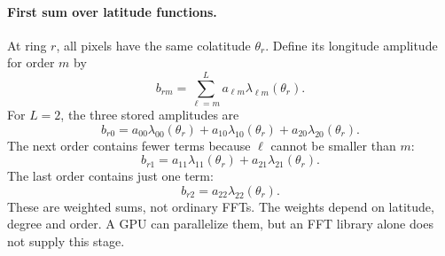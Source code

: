 \documentclass[11pt]{article}
\begin{document}
\paragraph{First sum over latitude functions.}
At ring $r$, all pixels have the same colatitude $\theta_r$. Define its
longitude amplitude for order $m$ by
\begin{equation}
 b_{rm}=\sum_{\ell=m}^{L}a_{\ell m}\lambda_{\ell m}(\theta_r).
\end{equation}
For $L=2$, the three stored amplitudes are
\begin{equation}
 b_{r0}=a_{00}\lambda_{00}(\theta_r)
       +a_{10}\lambda_{10}(\theta_r)+a_{20}\lambda_{20}(\theta_r).
\end{equation}
The next order contains fewer terms because $\ell$ cannot be smaller than $m$:
\begin{equation}
 b_{r1}=a_{11}\lambda_{11}(\theta_r)+a_{21}\lambda_{21}(\theta_r).
\end{equation}
The last order contains just one term:
\begin{equation}
 b_{r2}=a_{22}\lambda_{22}(\theta_r).
\end{equation}
These are weighted sums, not ordinary FFTs. The weights depend on latitude,
degree and order. A GPU can parallelize them, but an FFT library alone does
not supply this stage.
\end{document}
